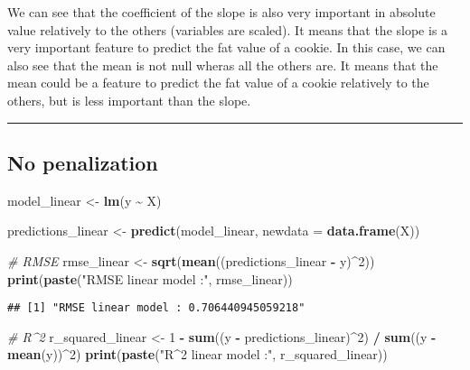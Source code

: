 \documentclass[
]{article}
\newenvironment{Shaded}{\begin{snugshade}}{\end{snugshade}}
\newcommand{\AttributeTok}[1]{\textcolor[rgb]{0.13,0.29,0.53}{#1}}
\newcommand{\CommentTok}[1]{\textcolor[rgb]{0.56,0.35,0.01}{\textit{#1}}}
\newcommand{\DecValTok}[1]{\textcolor[rgb]{0.00,0.00,0.81}{#1}}
\newcommand{\FunctionTok}[1]{\textcolor[rgb]{0.13,0.29,0.53}{\textbf{#1}}}
\newcommand{\NormalTok}[1]{#1}
\newcommand{\OtherTok}[1]{\textcolor[rgb]{0.56,0.35,0.01}{#1}}
\newcommand{\SpecialCharTok}[1]{\textcolor[rgb]{0.81,0.36,0.00}{\textbf{#1}}}
\newcommand{\StringTok}[1]{\textcolor[rgb]{0.31,0.60,0.02}{#1}}
\begin{document}
We can see that the coefficient of the slope is also very important in
absolute value relatively to the others (variables are scaled). It means
that the slope is a very important feature to predict the fat value of a
cookie. In this case, we can also see that the mean is not null wheras
all the others are. It means that the mean could be a feature to predict
the fat value of a cookie relatively to the others, but is less
important than the slope.

\begin{center}\rule{0.5\linewidth}{0.5pt}\end{center}

\subsection{No penalization}\label{no-penalization}

\begin{Shaded}
\begin{Highlighting}[]
\NormalTok{model\_linear }\OtherTok{\textless{}{-}} \FunctionTok{lm}\NormalTok{(y }\SpecialCharTok{\textasciitilde{}}\NormalTok{ X)}

\NormalTok{predictions\_linear }\OtherTok{\textless{}{-}} \FunctionTok{predict}\NormalTok{(model\_linear, }\AttributeTok{newdata =} \FunctionTok{data.frame}\NormalTok{(X))}

\CommentTok{\# RMSE}
\NormalTok{rmse\_linear }\OtherTok{\textless{}{-}} \FunctionTok{sqrt}\NormalTok{(}\FunctionTok{mean}\NormalTok{((predictions\_linear }\SpecialCharTok{{-}}\NormalTok{ y)}\SpecialCharTok{\^{}}\DecValTok{2}\NormalTok{)) }
\FunctionTok{print}\NormalTok{(}\FunctionTok{paste}\NormalTok{(}\StringTok{"RMSE linear model :"}\NormalTok{, rmse\_linear))}
\end{Highlighting}
\end{Shaded}

\begin{verbatim}
## [1] "RMSE linear model : 0.706440945059218"
\end{verbatim}

\begin{Shaded}
\begin{Highlighting}[]
\CommentTok{\# R\^{}2}
\NormalTok{r\_squared\_linear }\OtherTok{\textless{}{-}} \DecValTok{1} \SpecialCharTok{{-}} \FunctionTok{sum}\NormalTok{((y }\SpecialCharTok{{-}}\NormalTok{ predictions\_linear)}\SpecialCharTok{\^{}}\DecValTok{2}\NormalTok{) }\SpecialCharTok{/} \FunctionTok{sum}\NormalTok{((y }\SpecialCharTok{{-}} \FunctionTok{mean}\NormalTok{(y))}\SpecialCharTok{\^{}}\DecValTok{2}\NormalTok{)}
\FunctionTok{print}\NormalTok{(}\FunctionTok{paste}\NormalTok{(}\StringTok{"R\^{}2 linear model :"}\NormalTok{, r\_squared\_linear))}
\end{Highlighting}
\end{Shaded}
\end{document}
